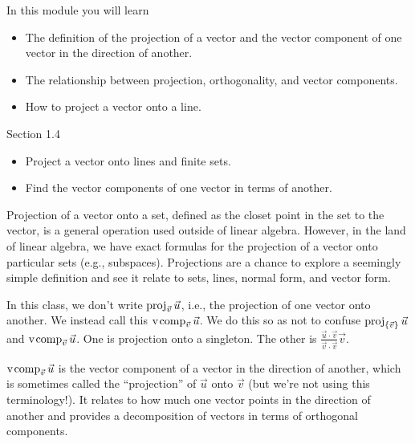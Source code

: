 \documentclass{problemset}
\newcommand{\bookonlynewpage}{\begin{bookonly}\newpage\end{bookonly}}
\begin{document}
\begin{module}

	In this module you will learn
	\begin{itemize}
		\item The definition of the projection of a vector and the vector component of one vector
			in the direction of another.
		\item The relationship between projection, orthogonality, and vector components.
		\item How to project a vector onto a line.
	\end{itemize}

	

\end{module}
\begin{lesson}

	Section 1.4

	\begin{itemize}
		\item Project a vector onto lines and finite sets.
		\item Find the vector components of one vector in terms of another.
	\end{itemize}

	Projection of a vector onto a set, defined as the closet point in the
	set to the vector, is a general operation used outside of linear algebra.
	However, in the land of linear algebra, we have exact formulas for the
	projection of a vector onto particular sets (e.g., subspaces). 
	Projections are a chance to explore a seemingly simple definition
	and see it relate to sets, lines, normal form, and vector form.

	\begin{annotation}
		\begin{notes}
			In this class, we don't write $\operatorname{proj}_{\vec v}\vec u$,
			i.e., the projection of one vector onto another. We
			instead call this $\operatorname{\operatorname{v\hspace{1pt}comp}}_{\vec v}\vec u$. We do this so
			as not to confuse $\operatorname{proj}_{\{\vec v\}}\vec u$ and
			$\operatorname{\operatorname{v\hspace{1pt}comp}}_{\vec v}\vec u$. One is projection onto a singleton.
			The other is $\frac{\vec u\cdot \vec v}{\vec v\cdot \vec v}\vec v$.
		\end{notes}
	\end{annotation}
	$\operatorname{\operatorname{v\hspace{1pt}comp}}_{\vec v}\vec u$ is the vector component of a vector in the direction of another,
	which is sometimes called the ``projection'' of $\vec u$ onto $\vec v$ (but we're not using
	this terminology!). It relates
	to how much one vector points in the direction of another and
	provides a decomposition of vectors in terms of orthogonal components.


\end{lesson}
	\bookonlynewpage
\end{document}
